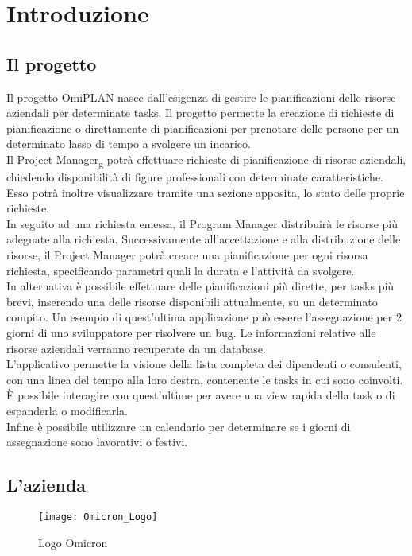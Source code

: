 \chapter{Introduzione}
\label{cap:introduzione}
\section{Il progetto}
Il progetto OmiPLAN nasce dall’esigenza di gestire le pianificazioni delle risorse aziendali per determinate tasks. Il progetto permette la creazione di richieste di pianificazione o direttamente di pianificazioni per prenotare delle persone per un determinato lasso di tempo a svolgere un incarico.\\
Il Project Manager\textsubscript{g} potrà effettuare richieste di pianificazione di risorse aziendali, chiedendo disponibilità di figure professionali con determinate caratteristiche. Esso potrà inoltre visualizzare tramite una sezione apposita, lo stato delle proprie richieste.\\
In seguito ad una richiesta emessa, il Program Manager distribuirà le risorse più adeguate alla richiesta. Successivamente all'accettazione e alla distribuzione delle risorse, il Project Manager potrà creare una pianificazione per ogni risorsa richiesta, specificando parametri quali la durata e l'attività da svolgere.\\
In alternativa è possibile effettuare delle pianificazioni più dirette, per tasks più brevi, inserendo una delle risorse disponibili attualmente, su un determinato compito. Un esempio di quest’ultima applicazione può essere l’assegnazione per 2 giorni di uno sviluppatore per risolvere un bug.  
Le informazioni relative alle risorse aziendali verranno recuperate da un database.\\
L’applicativo permette la visione della lista completa dei dipendenti o consulenti, con una linea del tempo alla loro destra, contenente le tasks in cui sono coinvolti. È possibile interagire con quest'ultime per avere una view rapida della task o di espanderla o modificarla.\\ 
Infine è possibile utilizzare un calendario per determinare se i giorni di assegnazione sono lavorativi o festivi.


\section{L'azienda}

\begin{figure}[!h] 
    \centering 
    \texttt{[image: Omicron\_Logo]} 
    \caption{Logo Omicron}
\end{figure}

